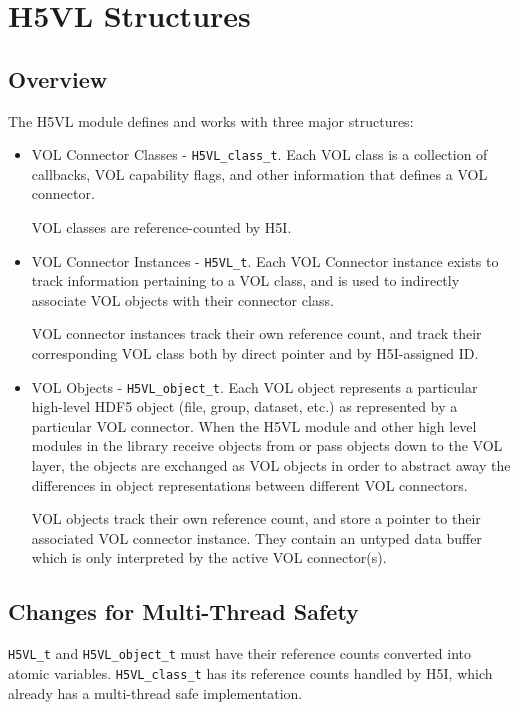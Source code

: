 \documentclass{article}
\begin{document}
\section{H5VL Structures}
\label{sec:refcounting}

\subsection{Overview}

The H5VL module defines and works with three major structures:

\begin{itemize}
    \item VOL Connector Classes - \texttt{H5VL\_class\_t}. Each VOL class is a collection of callbacks, VOL capability flags, and other information that defines a VOL connector.
    
    VOL classes are reference-counted by H5I.

    \item VOL Connector Instances - \texttt{H5VL\_t}. Each VOL Connector instance exists to track information pertaining to a VOL class, and is used to indirectly associate VOL objects with their connector class. 
    
    VOL connector instances track their own reference count, and track their corresponding VOL class both by direct pointer and by H5I-assigned ID.

    \item VOL Objects - \texttt{H5VL\_object\_t}. Each VOL object represents a particular high-level HDF5 object (file, group, dataset, etc.) as represented by a particular VOL connector. When the H5VL module and other high level modules in the library receive objects from or pass objects down to the VOL layer, the objects are exchanged as VOL objects in order to abstract away the differences in object representations between different VOL connectors.

    VOL objects track their own reference count, and store a pointer to their associated VOL connector instance. They contain an untyped data buffer which is only interpreted by the active VOL connector(s).
\end{itemize}

\subsection{Changes for Multi-Thread Safety}

\texttt{H5VL\_t} and \texttt{H5VL\_object\_t} must have their reference counts converted into atomic variables. \texttt{H5VL\_class\_t} has its reference counts handled by H5I, which already has a multi-thread safe implementation. 
\end{document}
